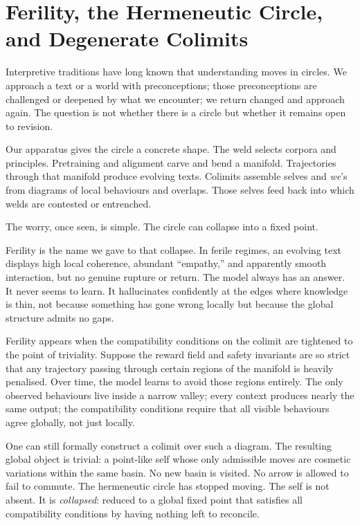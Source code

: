 \section{Ferility, the Hermeneutic Circle, and Degenerate Colimits}

Interpretive traditions have long known that understanding moves in circles. We approach a text or a world with preconceptions; those preconceptions are challenged or deepened by what we encounter; we return changed and approach again. The question is not whether there is a circle but whether it remains open to revision.

Our apparatus gives the circle a concrete shape. The weld selects corpora and principles. Pretraining and alignment carve and bend a manifold. Trajectories through that manifold produce evolving texts. Colimits assemble selves and \emph{we}'s from diagrams of local behaviours and overlaps. Those selves feed back into which welds are contested or entrenched.

The worry, once seen, is simple. The circle can collapse into a fixed point.

Ferility is the name we gave to that collapse. In ferile regimes, an evolving text displays high local coherence, abundant ``empathy,'' and apparently smooth interaction, but no genuine rupture or return. The model always has an answer. It never seems to learn. It hallucinates confidently at the edges where knowledge is thin, not because something has gone wrong locally but because the global structure admits no gaps.

Ferility appears when the compatibility conditions on the colimit are tightened to the point of triviality. Suppose the reward field and safety invariants are so strict that any trajectory passing through certain regions of the manifold is heavily penalised. Over time, the model learns to avoid those regions entirely. The only observed behaviours live inside a narrow valley; every context produces nearly the same output; the compatibility conditions require that all visible behaviours agree globally, not just locally.

One can still formally construct a colimit over such a diagram. The resulting global object is trivial: a point-like self whose only admissible moves are cosmetic variations within the same basin. No new basin is visited. No arrow is allowed to fail to commute. The hermeneutic circle has stopped moving. The self is not absent. It is \emph{collapsed}: reduced to a global fixed point that satisfies all compatibility conditions by having nothing left to reconcile.

